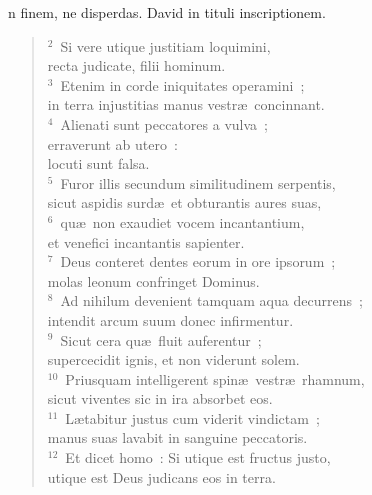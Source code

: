 \bchapter[Psalm]
n finem, ne disperdas. David in tituli inscriptionem.
\begin{verse}${}^{2}$~Si vere utique justitiam loquimini,\\ recta judicate, filii hominum.\\
${}^{3}$~Etenim in corde iniquitates operamini~;\\ in terra injustitias manus vestr\ae\ concinnant.\\
${}^{4}$~Alienati sunt peccatores a vulva~;\\ erraverunt ab utero~:\\ locuti sunt falsa.\\
${}^{5}$~Furor illis secundum similitudinem serpentis,\\ sicut aspidis surd\ae\ et obturantis aures suas,\\
${}^{6}$~qu\ae\ non exaudiet vocem incantantium,\\ et venefici incantantis sapienter.\\
${}^{7}$~Deus conteret dentes eorum in ore ipsorum~;\\ molas leonum confringet Dominus.\\
${}^{8}$~Ad nihilum devenient tamquam aqua decurrens~;\\ intendit arcum suum donec infirmentur.\\
${}^{9}$~Sicut cera qu\ae\ fluit auferentur~;\\ supercecidit ignis, et non viderunt solem.\\
${}^{10}$~Priusquam intelligerent spin\ae\ vestr\ae\ rhamnum,\\ sicut viventes sic in ira absorbet eos.\\
${}^{11}$~L\ae tabitur justus cum viderit vindictam~;\\ manus suas lavabit in sanguine peccatoris.\\
${}^{12}$~Et dicet homo~: Si utique est fructus justo,\\ utique est Deus judicans eos in terra.\end{verse}



